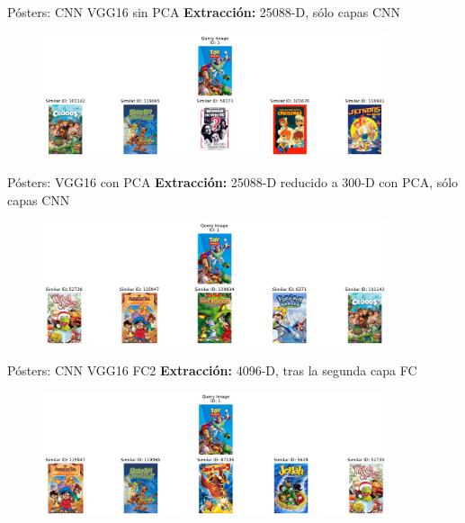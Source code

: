 \documentclass{beamer}
\begin{document}
\begin{frame}{Pósters: CNN VGG16 sin PCA}
    \textbf{Extracción:} 25088-D, sólo capas CNN

    \begin{figure}
        \centering
        \includegraphics[width=0.9\textwidth]{images/vgg16_cnn_nopca.png}        
    \end{figure}
\end{frame}

\begin{frame}{Pósters: VGG16 con PCA}
   \textbf{Extracción:} 25088-D reducido a 300-D con PCA, sólo capas CNN

    \begin{figure}
        \centering
        \includegraphics[width=0.9\textwidth]{images/vgg16_cnn.png}
    \end{figure}
\end{frame}

\begin{frame}{Pósters: CNN VGG16 FC2}
    \textbf{Extracción:} 4096-D, tras la segunda capa FC

    \begin{figure}
        \centering
        \includegraphics[width=0.9\textwidth]{images/vgg16_fc2_nopca.png}
    \end{figure}
\end{frame}
\end{document}
